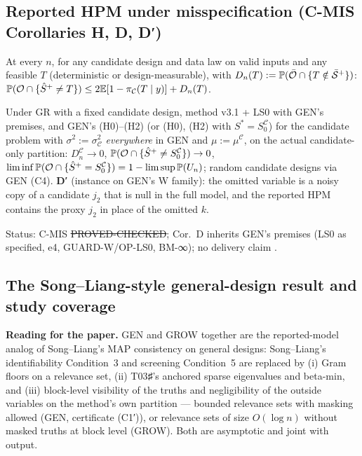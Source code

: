 \subsection{Reported HPM under misspecification (C-MIS Corollaries H, D, D′)}\label{sec:misD}
\begin{corollary}[H]\label{cor:MISH}
At every $n$, for any candidate design and data law on valid inputs and any feasible $T$ (deterministic or design-measurable), with $D_n(T):=\mathbb P(\bar{\mathcal O}\cap\{T\notin\bar{\mathcal S}^{+}\})$: $\mathbb P(\mathcal O\cap\{\hat S^{+}\ne T\})\le2\mathbb E[1-\pi_{\mathcal C}(T\mid y)]+D_n(T)$.
\end{corollary}
\begin{corollary}[D, D′]\label{cor:MISD}
Under GR with a fixed candidate design, method v3.1 + LS0 with GEN's premises, and GEN's (H0)--(H2) (or (H0), (H2) with $S^*=S_0^{\mathcal C}$) for the candidate problem with $\sigma^2:=\sigma^2_{\mathcal C}$ \emph{everywhere} in GEN and $\mu:=\mu^{\mathcal C}$, on the actual candidate-only partition: $D_n^{\mathcal C}\to0$, $\mathbb P(\mathcal O\cap\{\hat S^{+}\ne S_0^{\mathcal C}\})\to0$, $\liminf\mathbb P(\mathcal O\cap\{\hat S^{+}=S_0^{\mathcal C}\})=1-\limsup\mathbb P(U_n)$; random candidate designs via GEN (C4). \textbf{D′} (instance on GEN's W family): the omitted variable is a noisy copy of a candidate $j_2$ that is null in the full model, and the reported HPM contains the proxy $j_2$ in place of the omitted $k$.
\end{corollary}
Status: C-MIS \st{PROVED-CHECKED}; Cor.~D inherits GEN's premises (LS0 as specified, e4, GUARD-W/OP-LS0, BM-∞); no delivery claim .

\subsection{The Song--Liang-style general-design result and study coverage}\label{sec:coverage}
\textbf{Reading for the paper.} GEN and GROW together are the reported-model analog of Song--Liang's MAP consistency on general designs: Song--Liang's identifiability Condition~3 and screening Condition~5 are replaced by (i) Gram floors on a relevance set, (ii) T03♯'s anchored sparse eigenvalues and beta-min, and (iii) block-level visibility of the truths and negligibility of the outside variables on the method's own partition — bounded relevance sets with masking allowed (GEN, certificate (C1′)), or relevance sets of size $O(\log n)$ without masked truths at block level (GROW). Both are asymptotic and joint with output.

